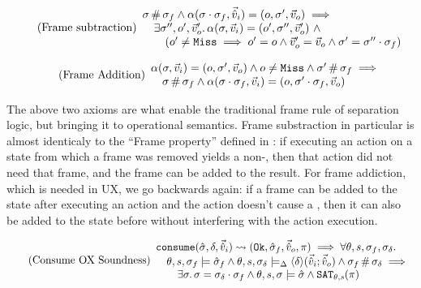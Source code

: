 \begin{equation}
\tag{Frame subtraction}\label{eq:frame-sub}
\begin{array}{l}
\sigma\operatorname{\#}\sigma_f \land \alpha(\sigma\cdot\sigma_f,\vec{\hat{v}}_i)=(o, \sigma',\vec{v}_o) \implies \\
\quad\exists \sigma'', o', \vec{v}_o'\ldotp \alpha(\sigma,\vec{v}_i)=(o', \sigma'', \vec{v}_o') ~\land \\
\qquad(o' \neq \texttt{Miss} \implies o' = o \land  \vec{v}_o' = \vec{v}_o \land \sigma' = \sigma'' \cdot \sigma_f)
\end{array}
\end{equation}

\begin{equation}
\tag{Frame Addition}\label{eq:frame-add}
\begin{array}{l}
\alpha(\sigma,\vec{v}_i)=(o, \sigma', \vec{v}_o) \land o \neq \texttt{Miss} \land \sigma'\operatorname{\#}\sigma_f\implies\\
\quad\sigma \operatorname{\#} \sigma_f \land \alpha(\sigma\cdot\sigma_f, \vec{v}_i)=(o, \sigma'\cdot\sigma_f, \vec{v}_o)
\end{array}
\end{equation}

The above two axioms are what enable the traditional frame rule of separation logic, but bringing it to operational semantics. Frame substraction in particular is almost identicaly to the ``Frame property'' defined in \cite{localreasoning}: if executing an action on a state from which a frame was removed yields a non-\Miss, then that action did not need that frame, and the frame can be added to the result. For frame addiction, which is needed in UX, we go backwards again: if a frame can be added to the state after executing an action and the action doesn't cause a \Miss, then it can also be added to the state before without interfering with the action execution.

\begin{equation}
\tag{Consume OX Soundness}\label{eq:consume-ox-sound}
\begin{array}{l}
\texttt{consume}(\hat{\sigma},\delta,\vec{\hat{v}}_i)\rightsquigarrow (\texttt{Ok},\hat{\sigma}_f,\vec{\hat{v}}_o,\pi) \implies \forall \theta,s,\sigma_f,\sigma_\delta\ldotp \\
\quad \theta,s,\sigma_f\models \hat{\sigma}_f \land \theta, s, \sigma_\delta \models_{\Delta} \left<\delta\right>\!(\vec{\hat{v}}_i;\vec{\hat{v}}_o) \land \sigma_f\operatorname{\#}\sigma_\delta \implies \\
\qquad \exists \sigma\ldotp \sigma = \sigma_\delta \cdot \sigma_f \land \theta,s,\sigma\models \hat{\sigma} \land \texttt{SAT}_{\mathit{\theta,s}}(\pi)
\end{array}
\end{equation}

